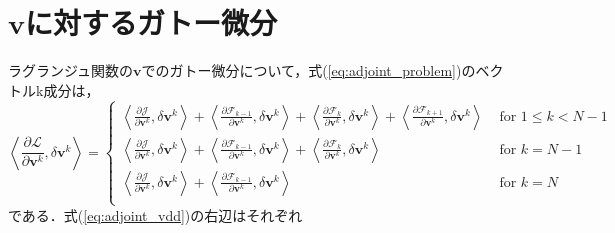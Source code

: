 \section{$\mathbf{v}$に対するガトー微分}
ラグランジュ関数の$\mathbf{v}$でのガトー微分について，式(\ref{eq:adjoint_problem})のベクトルk成分は，
\begin{equation}
    \label{eq:adjoint_vdd}
    \left\langle\frac{\partial \mathcal{L}}{\partial \mathbf{v}^k}, \delta \mathbf{v}^k\right\rangle
    = \begin{cases}
      \displaystyle \left\langle\frac{\partial \mathcal{J}}{\partial \mathbf{v}^{k}}, \delta \mathbf{v}^{k}\right\rangle
      + \displaystyle \left\langle\frac{\partial \mathcal{F}_{k-1}}{\partial \mathbf{v}^{k}}, \delta \mathbf{v}^{k}\right\rangle
      + \displaystyle \left\langle\frac{\partial \mathcal{F}_{k}}{\partial \mathbf{v}^{k}}, \delta \mathbf{v}^{k}\right\rangle
      + \displaystyle \left\langle\frac{\partial \mathcal{F}_{k+1}}{\partial \mathbf{v}^{k}}, \delta \mathbf{v}^{k}\right\rangle 
      & \text { for } 1 \leq k<N-1 \\[12pt]
      \displaystyle \left\langle\frac{\partial \mathcal{J}}{\partial \mathbf{v}^{k}}, \delta \mathbf{v}^{k}\right\rangle
      + \displaystyle \left\langle\frac{\partial \mathcal{F}_{k-1}}{\partial \mathbf{v}^{k}}, \delta \mathbf{v}^{k}\right\rangle
      + \displaystyle \left\langle\frac{\partial \mathcal{F}_{k}}{\partial \mathbf{v}^{k}}, \delta \mathbf{v}^{k}\right\rangle
      & \text { for } k=N-1 \\[12pt]
      \displaystyle \left\langle\frac{\partial \mathcal{J}}{\partial \mathbf{v}^{k}}, \delta \mathbf{v}^{k}\right\rangle
      + \displaystyle \left\langle\frac{\partial \mathcal{F}_{k-1}}{\partial \mathbf{v}^{k}}, \delta \mathbf{v}^{k}\right\rangle
      & \text { for } k=N \\[12pt]
    \end{cases}
\end{equation}
である．式(\ref{eq:adjoint_vdd})の右辺はそれぞれ
